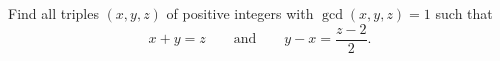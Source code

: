 Find all triples $(x,y,z)$ of positive integers with $\gcd(x,y,z)=1$ such that
\[
x+y=z\qquad\text{and}\qquad y-x=\dfrac{z-2}{2}.
\]
